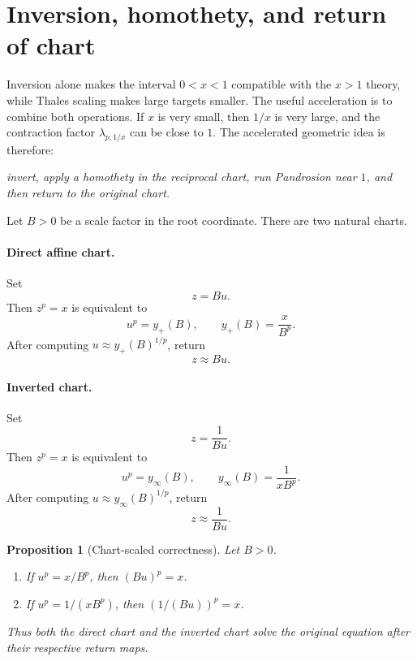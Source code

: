 \documentclass[10pt,a4paper]{article}
\theoremstyle{plain}
\newtheorem{proposition}[theorem]{Proposition}
\theoremstyle{definition}
\theoremstyle{remark}
\begin{document}
\section{Inversion, homothety, and return of chart}
\label{sec:riemann-chart-scaling}

Inversion alone makes the interval $0<x<1$ compatible with the $x>1$ theory,
while Thales scaling makes large targets smaller.  The useful acceleration is to
combine both operations.  If $x$ is very small, then $1/x$ is very large, and the
contraction factor
$\lambda_{p,1/x}$ can be close to $1$.  The accelerated geometric idea is
therefore:

\begin{center}
\emph{invert, apply a homothety in the reciprocal chart, run Pandrosion near
$1$, and then return to the original chart.}
\end{center}

Let $B>0$ be a scale factor in the root coordinate.  There are two natural
charts.

\paragraph{Direct affine chart.}
Set
\[
  z=B u.
\]
Then $z^p=x$ is equivalent to
\begin{equation}
  u^p=y_+(B),
  \qquad
  y_+(B)=\frac{x}{B^p}.
  \label{eq:direct-chart-target}
\end{equation}
After computing $u\approx y_+(B)^{1/p}$, return
\[
  z\approx B u.
\]

\paragraph{Inverted chart.}
Set
\[
  z=\frac{1}{B u}.
\]
Then $z^p=x$ is equivalent to
\begin{equation}
  u^p=y_\infty(B),
  \qquad
  y_\infty(B)=\frac{1}{xB^p}.
  \label{eq:inverted-chart-target}
\end{equation}
After computing $u\approx y_\infty(B)^{1/p}$, return
\[
  z\approx \frac{1}{B u}.
\]

\begin{proposition}[Chart-scaled correctness]
Let $B>0$.
\begin{enumerate}
  \item If $u^p=x/B^p$, then $(Bu)^p=x$.
  \item If $u^p=1/(xB^p)$, then $(1/(Bu))^p=x$.
\end{enumerate}
Thus both the direct chart and the inverted chart solve the original equation
after their respective return maps.
\end{proposition}
\end{document}

